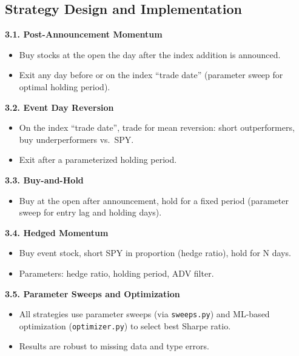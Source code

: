 \documentclass[11pt]{article}
\providecommand{\tightlist}{%
      \setlength{\itemsep}{0pt}\setlength{\parskip}{0pt}}
\begin{document}
    
    \subsection*{Strategy Design and Implementation}

\textbf{3.1. Post-Announcement Momentum}

\begin{itemize}
\tightlist
\item
  Buy stocks at the open the day after the index addition is announced.
\item
  Exit any day before or on the index ``trade date'' (parameter sweep
  for optimal holding period).
\end{itemize}

\textbf{3.2. Event Day Reversion}

\begin{itemize}
\tightlist
\item
  On the index ``trade date'', trade for mean reversion: short
  outperformers, buy underperformers vs.~SPY.
\item
  Exit after a parameterized holding period.
\end{itemize}

\textbf{3.3. Buy-and-Hold}

\begin{itemize}
\tightlist
\item
  Buy at the open after announcement, hold for a fixed period (parameter
  sweep for entry lag and holding days).
\end{itemize}

\textbf{3.4. Hedged Momentum}

\begin{itemize}
\tightlist
\item
  Buy event stock, short SPY in proportion (hedge ratio), hold for N
  days.
\item
  Parameters: hedge ratio, holding period, ADV filter.
\end{itemize}

\textbf{3.5. Parameter Sweeps and Optimization}

\begin{itemize}
\tightlist
\item
  All strategies use parameter sweeps (via \texttt{sweeps.py}) and
  ML-based optimization (\texttt{optimizer.py}) to select best Sharpe
  ratio.
\item
  Results are robust to missing data and type errors.
\end{itemize}
\end{document}
